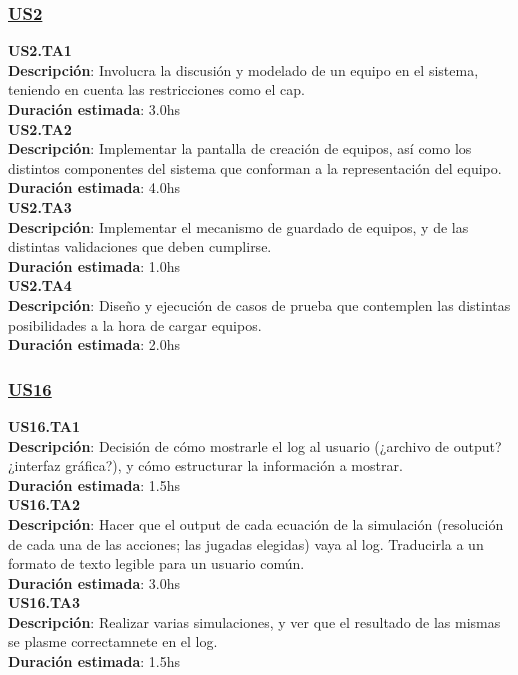 \begin{tcolorbox}
\subsubsection*{\underline{US2}}
\textbf{US2.TA1} \\
\textbf{Descripción}: Involucra la discusión y modelado de un equipo en el sistema, teniendo en cuenta las restricciones como el cap.\\
\textbf{Duración estimada}: 3.0hs \\
\newline
\textbf{US2.TA2} \\
\textbf{Descripción}: Implementar la pantalla de creación de equipos, así como los distintos componentes del sistema que conforman a la representación del equipo.\\
\textbf{Duración estimada}: 4.0hs \\
\newline
\textbf{US2.TA3} \\
\textbf{Descripción}: Implementar el mecanismo de guardado de equipos, y de las distintas validaciones que deben cumplirse.\\
\textbf{Duración estimada}: 1.0hs \\
\newline
\textbf{US2.TA4} \\
\textbf{Descripción}: Diseño y ejecución de casos de prueba que contemplen las distintas posibilidades a la hora de cargar equipos.\\
\textbf{Duración estimada}: 2.0hs
\end{tcolorbox}
\vspace{10pt}


\begin{tcolorbox}
\subsubsection*{\underline{US16}}
\textbf{US16.TA1} \\
\textbf{Descripción}:  Decisión de cómo mostrarle el log al usuario (¿archivo de output? ¿interfaz gráfica?), y cómo estructurar la información a mostrar. \\
\textbf{Duración estimada}: 1.5hs \\
\newline
\textbf{US16.TA2} \\
\textbf{Descripción}: Hacer que el output de cada ecuación de la simulación (resolución de cada una de las acciones; las jugadas elegidas) vaya al log. Traducirla a un formato de texto legible para un usuario común.\\
\textbf{Duración estimada}: 3.0hs \\
\newline
\textbf{US16.TA3} \\
\textbf{Descripción}: Realizar varias simulaciones, y ver que el resultado de las mismas se plasme correctamnete en el log.\\
\textbf{Duración estimada}: 1.5hs
\end{tcolorbox}
\vspace{10pt}



